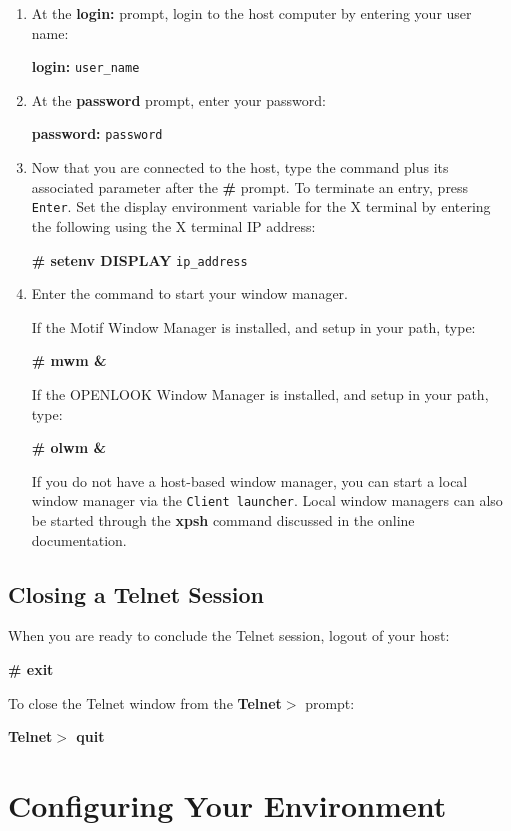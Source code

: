 \documentclass[11pt]{article}
\begin{document}
\begin {enumerate}

\item At the {\bf login:} prompt, login to the host computer by entering your
user name:

{\bf login:} {\tt user\_name}

\item At the {\bf password} prompt, enter your password:

{\bf password:} {\tt password}

\item Now that you are connected to the host, type the command plus its
associated parameter after the {\bf \#} prompt. To terminate an entry, press
{\tt Enter}. Set the display environment variable for the X terminal by entering
the following using the X terminal IP address:

{\bf \# setenv DISPLAY} {\tt ip\_address}

\item Enter the command to start your window manager.

If the Motif Window Manager is installed, and setup in your path, type:

{\bf \# mwm \&}

If the OPENLOOK Window Manager is installed, and setup in your path, type:

{\bf \# olwm \&}

If you do not have a host-based window manager, you can start a local window
manager via the {\tt Client launcher}. Local window managers can also be started
through the {\bf xpsh} command discussed in the online documentation.

\end {enumerate}


\subsection {Closing a Telnet Session}

When you are ready to conclude the Telnet session, logout of your host:

{\bf \# exit}

To close the Telnet window from the {\bf Telnet$>$} prompt:

{\bf Telnet$>$ quit}


\section {Configuring Your Environment}
\end{document}
